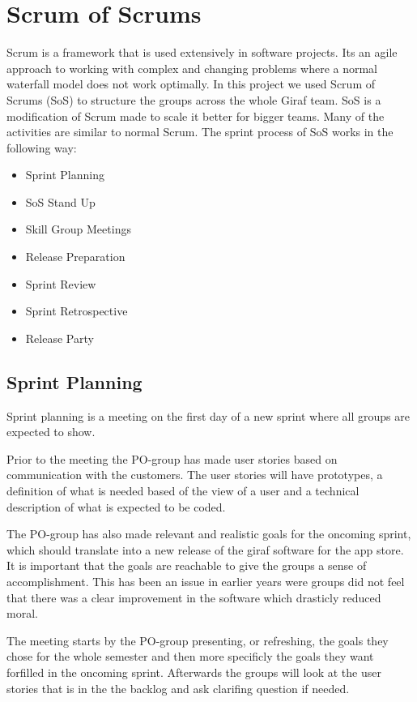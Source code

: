 \section{Scrum of Scrums}
Scrum is a framework that is used extensively in software projects.
Its an agile approach to working with complex and changing problems where a normal waterfall model does not work optimally.
In this project we used Scrum of Scrums (SoS) to structure the groups across the whole Giraf team.
SoS is a modification of Scrum made to scale it better for bigger teams.
Many of the activities are similar to normal Scrum.
The sprint process of SoS works in the following way:

\begin{itemize}
    \item Sprint Planning
    \item SoS Stand Up
    \item Skill Group Meetings
    \item Release Preparation
    \item Sprint Review
    \item Sprint Retrospective
    \item Release Party
\end{itemize}

\subsection{Sprint Planning}
Sprint planning is a meeting on the first day of a new sprint where all groups are expected to show.

Prior to the meeting the PO-group has made user stories based on communication with the customers.
The user stories will have prototypes, a definition of what is needed based of the view of a user and a technical description of what is expected to be coded.

The PO-group has also made relevant and realistic goals for the oncoming sprint, which should translate into a new release of the giraf software for the app store.
It is important that the goals are reachable to give the groups a sense of accomplishment.
This has been an issue in earlier years were groups did not feel that there was a clear improvement in the software which drasticly reduced moral.

The meeting starts by the PO-group presenting, or refreshing, the goals they chose for the whole semester and then more specificly the goals they want forfilled in the oncoming sprint.
Afterwards the groups will look at the user stories that is in the the backlog and ask clarifing question if needed.

